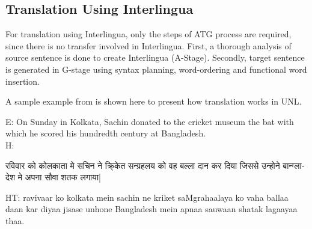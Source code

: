     \subsection{Translation Using Interlingua}
    For translation using Interlingua, only the steps of ATG process are required, since there is no transfer involved in Interlingua. First, a thorough analysis of source sentence is done to create Interlingua (A-Stage). Secondly, target sentence is generated in G-stage using syntax planning, word-ordering and functional word insertion.
    
    A sample example from \cite{bhattacharyya} is shown here to present how translation works in UNL.
    
    \begin{flushleft}
    E: On Sunday in Kolkata, Sachin donated to the cricket museum the bat with which he scored his hundredth century at Bangladesh.\\
    H: 
    \begin{hindi}
    रविवार को कोलकाता मे सचिन ने क्रि्केत सन्ग्रहलय को वह बल्ला दान कर दिया जिससे उन्होने बान्ग्लादेश मे अपना सौवा शतक लगाया| \\
    \end{hindi}
    HT: ravivaar ko kolkata mein sachin ne kriket saMgrahaalaya ko vaha ballaa daan kar diyaa jisase unhone Bangladesh mein apnaa sauwaan shatak lagaayaa thaa.
    \end{flushleft}
    

